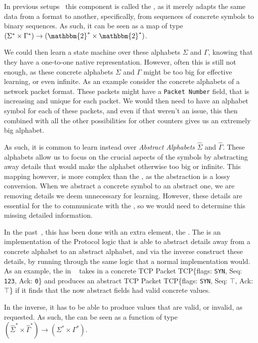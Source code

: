 In previous setups~\cite{tcp-learner} this component is called the \adapter, as it merely adapts the same data from a format to another, specifically, from sequences of concrete symbols to binary sequences. As such, it can be seen as a map of type $(\Sigma^* \times \Gamma^*) \to (\mathbbm{2}^* \times \mathbbm{2}^*)$.

We could then learn a state machine over these alphabets $\Sigma$ and $\Gamma$, knowing that they have a one-to-one native representation. However, often this is still not enough, as these concrete alphabets $\Sigma$ and $\Gamma$ might be too big for effective learning, or even infinite. As an example consider the concrete alphabets of a network packet format. These packets might have a \texttt{Packet Number} field, that is increasing and unique for each packet. We would then need to have an alphabet symbol for each of these packets, and even if that weren't an issue, this then combined with all the other possibilities for other counters gives us an extremely big alphabet. 

As such, it is common to learn instead over \textit{Abstract Alphabets} $\hat\Sigma$ and $\hat\Gamma$. These alphabets allow us to focus on the crucial aspects of the symbols by abstracting away details that would make the alphabet otherwise too big or infinite. This mapping however, is more complex than the \adapter, as the abstraction is a lossy conversion. When we abstract a concrete symbol to an abstract one, we are removing details we deem unnecessary for learning. However, these details are essential for the \adapter to communicate with the \sul, so we would need to determine this missing detailed information.

In the past~\cite{tcp-mapper}, this has been done with an extra element, the \mapper. The \mapper is an implementation of the Protocol logic that is able to abstract details away from a concrete alphabet to an abstract alphabet, and via the inverse construct these details, by running through the same logic that a normal implementation would. As an example, the \mapper in ~\cite{tcp-mapper} takes in a concrete TCP Packet TCP\{flags: \texttt{SYN}, Seq: \texttt{123}, Ack: \texttt{0}\} and produces an abstract TCP Packet TCP\{flags: \texttt{SYN}, Seq: $\top$, Ack: $\top$\} if it finds that the now abstract fields had valid concrete values. 

In the inverse, it has to be able to produce values that are valid, or invalid, as requested. As such, the \mapper can be seen as a function of type $(\hat\Sigma^* \times \hat\Gamma^*) \to (\Sigma^* \times \Gamma^*)$.

